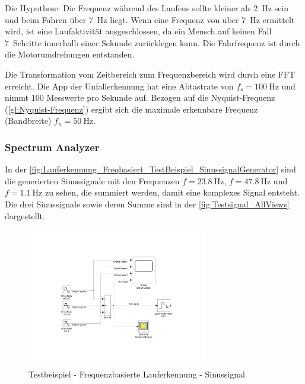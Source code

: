 Die Hypothese: Die Frequenz während des Laufens sollte kleiner als \SI{2}{\hertz} sein und beim Fahren über \SI{7}{\hertz} liegt. Wenn eine Frequenz von über \SI{7}{\hertz} ermittelt wird, ist eine Laufaktivität ausgeschlossen, da ein Mensch auf keinen Fall \SI{7}{Schritte} innerhalb einer Sekunde zurücklegen kann. Die Fahrfrequenz ist durch die Motorumdrehungen entstanden. 

Die Transformation vom Zeitbereich zum Frequenzbereich wird durch eine FFT erreicht.
Die App der Unfallerkennung hat eine Abtastrate von $f_s = \SI{100}{\hertz}$ und nimmt 100 Messwerte pro Sekunde auf.
Bezogen auf die Nyquist-Frequenz (\autoref{gl:Nyquist-Frequenz}) ergibt sich die maximale erkennbare Frequenz (Bandbreite) $f_n = \SI{50}{\hertz}$.

\subsubsection{Spectrum Analyzer}
In der \autoref{fig:Lauferkennung_Freqbasiert_TestBeispiel_SinussignalGenerator} sind die generierten Sinussignale mit den Frequenzen $f=\SI{23,8}{\hertz}$, $f=\SI{47,8}{\hertz}$ und $f=\SI{1,1}{\hertz}$ zu sehen, die summiert werden, damit eine komplexes Signal entsteht. Die drei Sinussignale sowie deren Summe sind in der \autoref{fig:Testsignal_AllViews} dargestellt.
\begin{figure}[htpb]
	\centering
	\includegraphics[width=0.7\textwidth]{Bilder/Lauferkennung_Freqbasiert_TestBeispiel_SinussignalGenerator.pdf}
	\caption{Testbeispiel - Frequenzbasierte Lauferkennung - Sinussignal}
	\label{fig:Lauferkennung_Freqbasiert_TestBeispiel_SinussignalGenerator}
\end{figure}

